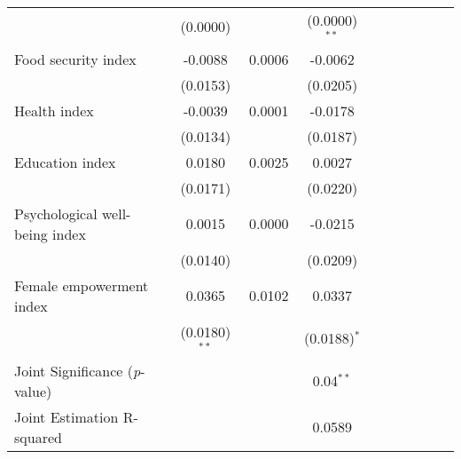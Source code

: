 {\begin{tabular}{l*{3}{SSS}}
          & (0.0000)&         &(0.0000)$^{**}$\\
Food security index&  -0.0088&   0.0006&  -0.0062\\
          & (0.0153)&         & (0.0205)\\
Health index&  -0.0039&   0.0001&  -0.0178\\
          & (0.0134)&         & (0.0187)\\
Education index&   0.0180&   0.0025&   0.0027\\
          & (0.0171)&         & (0.0220)\\
Psychological well-being index&   0.0015&   0.0000&  -0.0215\\
          & (0.0140)&         & (0.0209)\\
Female empowerment index&   0.0365&   0.0102&   0.0337\\
          &(0.0180)$^{**}$&         &(0.0188)$^{*}$\\
\midrule Joint Significance (\emph{p}-value)&         &         &0.04$^{**}$\\
Joint Estimation R-squared&         &         &   0.0589\\
\bottomrule
\end{tabular}
}
